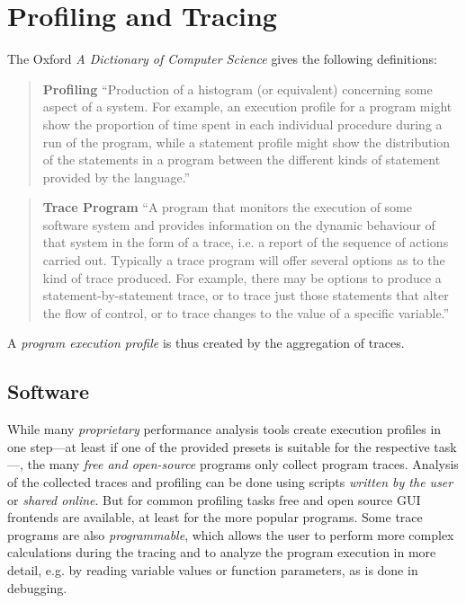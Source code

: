 \section{Profiling and Tracing} \label{sec:profilingtracing}

    The Oxford \textit{A Dictionary of Computer Science} \cite{Butterfield:2016} gives the following definitions:
    
    \begin{quote}
        \textbf{Profiling} ``Production of a histogram (or equivalent) concerning some aspect of a system. For example, an execution profile for a program might show the proportion of time spent in each individual procedure during a run of the program, while a statement profile might show the distribution of the statements in a program between the different kinds of statement provided by the language.''
    \end{quote}

    \begin{quote}
        \textbf{Trace Program} ``A program that monitors the execution of some software system and provides information on the dynamic behaviour of that system in the form of a trace, i.e. a report of the sequence of actions carried out. Typically a trace program will offer several options as to the kind of trace produced. For example, there may be options to produce a statement-by-statement trace, or to trace just those statements that alter the flow of control, or to trace changes to the value of a specific variable.''
    \end{quote}

    A \emph{program execution profile} is thus created by the aggregation of traces.

\subsection{Software}

    While many \emph{proprietary} performance analysis tools create execution profiles in one step---at least if one of the provided presets is suitable for the respective task---, the many \emph{free and open-source} programs only collect program traces. Analysis of the collected traces and profiling can be done using scripts \emph{written by the user} or \emph{shared online}. But for common profiling tasks free and open source GUI frontends are available, at least for the more popular programs. Some trace programs are also \emph{programmable}, which allows the user to perform more complex calculations during the tracing and to analyze the program execution in more detail, e.g. by reading variable values or function parameters, as is done in debugging.

